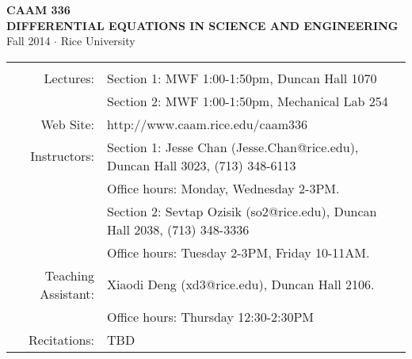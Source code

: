 \documentclass[10pt]{article}
\begin{document}
\vspace*{-6em}
\begin{center}
\large \textsf{\textbf{CAAM 336}}\\[0.5em]
       \textsf{\textbf{DIFFERENTIAL EQUATIONS IN SCIENCE AND ENGINEERING}\\[0.5em]
 Fall 2014 $\cdot$ Rice University}
\end{center}


\hspace*{-3em}
\begin{tabular}{rl}
\hline & \\[-.5em]
Lectures:			& Section 1: MWF 1:00-1:50pm, Duncan Hall 1070 \\
				& Section 2: MWF 1:00-1:50pm, Mechanical Lab 254 \\[.75em]
%
Web Site: 			& http://www.caam.rice.edu/\raisebox{1pt}{$\sim$}caam336 \\[.75em]
%
Instructors:  		& Section 1: Jesse Chan (Jesse.Chan@rice.edu), Duncan Hall 3023, (713) 348-6113 \\
				& Office hours: Monday, Wednesday 2-3PM.\\
		  		& Section 2: Sevtap Ozisik (so2@rice.edu), Duncan Hall 2038, (713) 348-3336 \\
				& Office hours: Tuesday 2-3PM, Friday 10-11AM.\\[.75em]
%
Teaching Assistant: 	& Xiaodi Deng (xd3@rice.edu), Duncan Hall 2106. \\
				& Office hours: Thursday 12:30-2:30PM\\[.75em]
Recitations: 		& TBD
\end{tabular}
\end{document}
